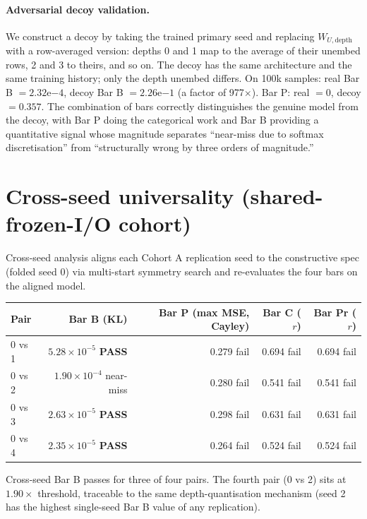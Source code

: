 \documentclass[11pt,letterpaper]{article}
\begin{document}
\paragraph{Adversarial decoy validation.} We construct a decoy by taking the trained primary seed and replacing $W_{U,\mathrm{depth}}$ with a row-averaged version: depths 0 and 1 map to the average of their unembed rows, 2 and 3 to theirs, and so on. The decoy has the same architecture and the same training history; only the depth unembed differs. On 100k samples: real Bar B $= 2.32\mathrm{e}{-4}$, decoy Bar B $= 2.26\mathrm{e}{-1}$ (a factor of 977$\times$). Bar P: real $= 0$, decoy $= 0.357$. The combination of bars correctly distinguishes the genuine model from the decoy, with Bar P doing the categorical work and Bar B providing a quantitative signal whose magnitude separates ``near-miss due to softmax discretisation'' from ``structurally wrong by three orders of magnitude.''

\section{Cross-seed universality (shared-frozen-I/O cohort)}
\label{sec:crossseed}

Cross-seed analysis aligns each Cohort A replication seed to the constructive spec (folded seed 0) via multi-start symmetry search and re-evaluates the four bars on the aligned model.

\begin{center}
\begin{tabular}{lrrrr}
\toprule
Pair & Bar B (KL) & Bar P (max MSE, Cayley) & Bar C ($r$) & Bar Pr ($r$) \\
\midrule
0 vs 1 & $5.28 \times 10^{-5}$ \textbf{PASS} & 0.279 fail & 0.694 fail & 0.694 fail \\
0 vs 2 & $1.90 \times 10^{-4}$ near-miss & 0.280 fail & 0.541 fail & 0.541 fail \\
0 vs 3 & $2.63 \times 10^{-5}$ \textbf{PASS} & 0.298 fail & 0.631 fail & 0.631 fail \\
0 vs 4 & $2.35 \times 10^{-5}$ \textbf{PASS} & 0.264 fail & 0.524 fail & 0.524 fail \\
\bottomrule
\end{tabular}
\end{center}

Cross-seed Bar B passes for three of four pairs. The fourth pair (0 vs 2) sits at $1.90\times$ threshold, traceable to the same depth-quantisation mechanism (seed 2 has the highest single-seed Bar B value of any replication).
\end{document}
